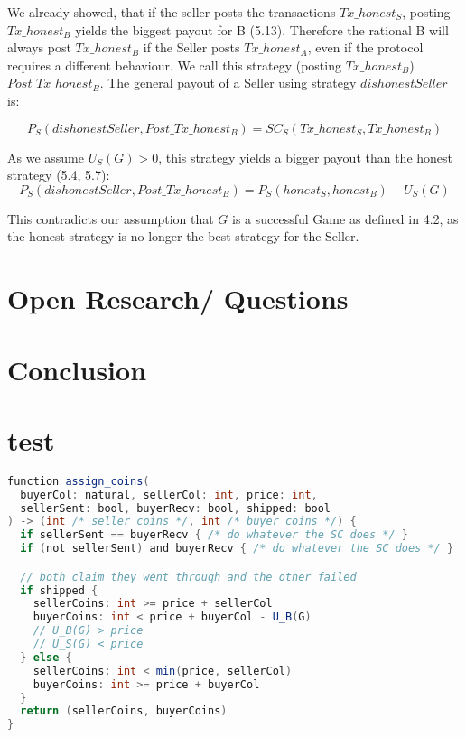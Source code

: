 \documentclass{cacthesis}
\begin{document}
We already showed, that if the seller posts the transactions $Tx\_honest_S$, posting $Tx\_honest_B$ yields the biggest payout for B (5.13).\newline
Therefore the rational B will always post $Tx\_honest_B$ if the Seller posts $Tx\_honest_A$, even if the protocol requires a different behaviour. We call this strategy (posting $Tx\_honest_B$) $Post\_Tx\_honest_B$.\newline
The general payout of a Seller using strategy $dishonestSeller$ is:

\begin{equation}
    P_S(dishonestSeller,Post\_Tx\_honest_B) = SC_S(Tx\_honest_S,Tx\_honest_B)
\end{equation}

As we assume $U_S(G) > 0$, this strategy yields a bigger payout than the honest strategy (5.4, 5.7):
\[P_S(dishonestSeller,Post\_Tx\_honest_B) = P_S(honest_S,honest_B) + U_S(G)\]

This contradicts our assumption that $G$ is a successful Game as defined in 4.2, as the honest strategy is no longer the best strategy for the Seller.

\chapter{Open Research/ Questions}

\chapter{Conclusion}

\chapter{test}
\begin{lstlisting}[language=java]
function assign_coins(
  buyerCol: natural, sellerCol: int, price: int,
  sellerSent: bool, buyerRecv: bool, shipped: bool
) -> (int /* seller coins */, int /* buyer coins */) {
  if sellerSent == buyerRecv { /* do whatever the SC does */ }
  if (not sellerSent) and buyerRecv { /* do whatever the SC does */ }

  // both claim they went through and the other failed
  if shipped {
    sellerCoins: int >= price + sellerCol
    buyerCoins: int < price + buyerCol - U_B(G)
    // U_B(G) > price
    // U_S(G) < price
  } else {
    sellerCoins: int < min(price, sellerCol)
    buyerCoins: int >= price + buyerCol
  }
  return (sellerCoins, buyerCoins)
}
\end{lstlisting}

	
	
	\appendix
\end{document}
